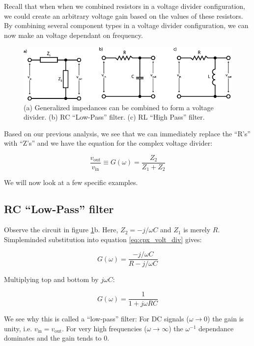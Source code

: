 \documentclass{tufte-book}
\begin{document}
Recall that when when we combined resistors in a voltage divider configuration, we could create an arbitrary voltage gain based on the values of these resistors. By combining several component types in a voltage divider configuration, we can now make an voltage dependant on frequency. 

\begin{figure}[h]
\caption{(a) Generalized impedances can be combined to form a voltage divider. (b) RC ``Low-Pass'' filter. (c) RL ``High Pass'' filter.}
\label{fig:cpx_volt_div}
\begin{center}
\includegraphics[width=\textwidth]{cpx_volt_div.png}
\end{center}
\end{figure}

Based on our previous analysis, we see that we can immediately replace the ``R's'' with ``Z's'' and we have the equation for the complex voltage divider:


\begin{equation}\label{eq:cpx_volt_div}
\frac{v_\text{out}}{v_\text{in}} \equiv G(\omega) = \frac{Z_2}{Z_1 + Z_2}
\end{equation}

\noindent We will now look at a few specific examples.

\subsection{RC ``Low-Pass'' filter}
Observe the circuit in figure \ref{fig:cpx_volt_div}b. Here, $Z_2 = -j/\omega C$ and $Z_1$ is merely $R$. Simpleminded substitution into equation \ref{eq:cpx_volt_div} gives:

$$
G(\omega) = \frac{-j/\omega C}{R - j/\omega C} 
$$

\noindent Multiplying top and bottom by $j\omega C$:

$$
G(\omega) = \frac{1}{1+j\omega RC}
$$

\noindent We see why this is called a ``low-pass'' filter: For DC signals ($\omega \rightarrow 0$) the gain is unity, i.e. $v_\text{in} =  v_\text{out}$. For very high frequencies ($\omega \rightarrow \infty$) the $\omega^{-1}$ dependance dominates and the gain tends to 0. 
\end{document}
